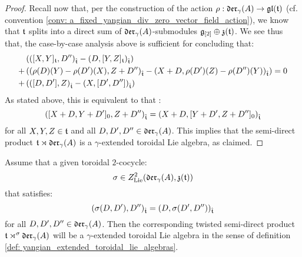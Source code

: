 \begin{proof}
                Recall now that, per the construction of the action $\rho: \mathfrak{der}_{\gamma}(A) \to \mathfrak{gl}(\mathfrak{t})$ (cf. convention \ref{conv: a_fixed_yangian_div_zero_vector_field_action}), we know that $\mathfrak{t}$ splits into a direct sum of $\mathfrak{der}_{\gamma}(A)$-submodules $\mathfrak{g}_{[2]} \oplus \mathfrak{z}(\mathfrak{t})$. We see thus that, the case-by-case analysis above is sufficient for concluding that:
                    $$
                        \begin{aligned}
                            & \left( ( [X, Y]_{\mathfrak{t}}, D'')_{\hat{\mathfrak{t}}} - (D, [Y, Z]_{\mathfrak{t}})_{\hat{\mathfrak{t}}} \right)
                            \\
                            + & \left( \left(\rho(D)(Y) - \rho(D')(X), Z + D'' \right)_{\hat{\mathfrak{t}}} - \left( X + D, \rho(D')(Z) - \rho(D'')(Y) \right)_{\hat{\mathfrak{t}}} \right)
                            \\
                            + & \left( \left( [D, D'], Z \right)_{\hat{\mathfrak{t}}} - \left(X, [D', D'']\right)_{\hat{\mathfrak{t}}} \right)
                        \end{aligned}
                        = 0
                    $$
                As stated above, this is equivalent to that :
                    $$\left( [X + D, Y + D']_0, Z + D'' \right)_{\hat{\mathfrak{t}}} = \left( X + D, [Y + D', Z + D'']_0 \right)_{\hat{\mathfrak{t}}}$$
                for all $X, Y, Z \in \mathfrak{t}$ and all $D, D', D'' \in \mathfrak{der}_{\gamma}(A)$. This implies that the semi-direct product $\mathfrak{t} \rtimes \mathfrak{der}_{\gamma}(A)$ is a $\gamma$-extended toroidal Lie algebra, as claimed.
            \end{proof}
        \begin{theorem} \label{theorem: yangian_criterion_for_toroidal_cocycles}
            Assume that a given toroidal $2$-cocycle:
                $$\sigma \in Z^2_{\mathrm{Lie}}(\mathfrak{der}_{\gamma}(A), \mathfrak{z}(\mathfrak{t}))$$
            that satisfies:
                $$(\sigma(D, D'), D'')_{\hat{\mathfrak{t}}} = (D, \sigma(D', D''))_{\hat{\mathfrak{t}}}$$
            for all $D, D', D'' \in \mathfrak{der}_{\gamma}(A)$. Then the corresponding twisted semi-direct product $\mathfrak{t} \rtimes^{\sigma} \mathfrak{der}_{\gamma}(A)$ will be a $\gamma$-extended toroidal Lie algebra in the sense of definition \ref{def: yangian_extended_toroidal_lie_algebras}.
        \end{theorem}
